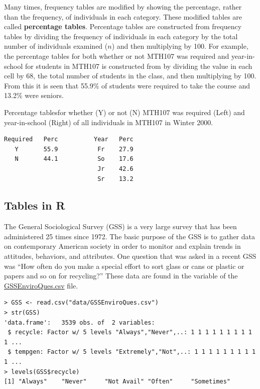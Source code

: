\documentclass[10pt,openany]{book}\usepackage[]{graphicx}\usepackage[]{color}
\makeatletter
\newenvironment{kframe}{%
 \def\at@end@of@kframe{}%
 \ifinner\ifhmode%
  \def\at@end@of@kframe{\end{minipage}}%
  \begin{minipage}{\columnwidth}%
 \fi\fi%
 \def\FrameCommand##1{\hskip\@totalleftmargin \hskip-\fboxsep
 \colorbox{shadecolor}{##1}\hskip-\fboxsep
     \hskip-\linewidth \hskip-\@totalleftmargin \hskip\columnwidth}%
 \MakeFramed {\advance\hsize-\width
   \@totalleftmargin\z@ \linewidth\hsize
   \@setminipage}}%
 {\par\unskip\endMakeFramed%
 \at@end@of@kframe}
\newenvironment{knitrout}{}{} %
\makeatother
\begin{document}
Many times, frequency tables are modified by showing the percentage, rather than the frequency, of individuals in each category.  These modified tables are called \textbf{percentage tables}.  Percentage tables are constructed from frequency tables by dividing the frequency of individuals in each category by the total number of individuals examined ($n$) and then multiplying by 100.  For example, the percentage tables for both whether or not MTH107 was required and year-in-school  for students in MTH107 is constructed from  by dividing the value in each cell by 68, the total number of students in the class, and then multiplying by 100.  From this it is seen that 55.9\% of students were required to take the course and 13.2\% were seniors.

\begin{table}[htbp]
  \caption{Percentage tablesfor whether (Y) or not (N) MTH107 was required (Left) and year-in-school (Right) of all individuals in MTH107 in Winter 2000.}
  \label{tab:Mth107Prop}
  \centering
  \begin{Verbatim}[xleftmargin=5mm]
Required   Perc          Year   Perc
   Y       55.9           Fr    27.9
   N       44.1           So    17.6
                          Jr    42.6
                          Sr    13.2
  \end{Verbatim}
\end{table}


\subsection{Tables in R}
The General Sociological Survey (GSS) is a very large survey that has been administered 25 times since 1972.  The basic purpose of the GSS is to gather data on contemporary American society in order to monitor and explain trends in attitudes, behaviors, and attributes.  One question that was asked in a recent GSS was ``How often do you make a special effort to sort glass or cans or plastic or papers and so on for recycling?''  These data are found in the  variable of the \href{https://raw.githubusercontent.com/droglenc/NCData/master/GSSEnviroQues.csv}{GSSEnviroQues.csv} file.
\begin{knitrout}
\color{fgcolor}\begin{kframe}
\begin{verbatim}
> GSS <- read.csv("data/GSSEnviroQues.csv")
> str(GSS)
'data.frame':	3539 obs. of  2 variables:
 $ recycle: Factor w/ 5 levels "Always","Never",..: 1 1 1 1 1 1 1 1 1 1 ...
 $ tempgen: Factor w/ 5 levels "Extremely","Not",..: 1 1 1 1 1 1 1 1 1 1 ...
> levels(GSS$recycle)
[1] "Always"    "Never"     "Not Avail" "Often"     "Sometimes"
\end{verbatim}
\end{kframe}
\end{knitrout}
\end{document}
